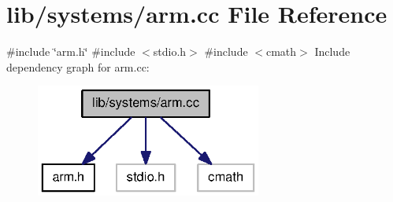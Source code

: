 \section{lib/systems/arm.cc \-File \-Reference}
\label{arm_8cc}
{\ttfamily \#include \char`\"{}arm.\-h\char`\"{}}\*
{\ttfamily \#include $<$stdio.\-h$>$}\*
{\ttfamily \#include $<$cmath$>$}\*
\-Include dependency graph for arm.\-cc\-:
\nopagebreak
\begin{figure}[H]
\begin{center}
\leavevmode
\includegraphics[width=210pt]{arm_8cc__incl}
\end{center}
\end{figure}
